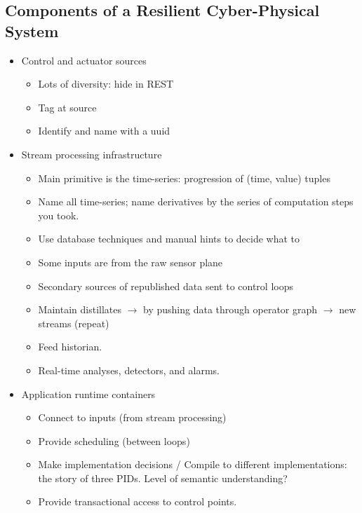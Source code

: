 \documentclass[10pt,twocolumn,letterpaper]{article}
\begin{document}
\subsection{Components of a Resilient Cyber-Physical System}


\begin{itemize}
\item Control and actuator sources
 \begin{itemize}
  \item{Lots of diversity: hide in REST}
  \item{Tag at source}
  \item{Identify and name with a uuid}
 \end{itemize}
\item Stream processing infrastructure
  \begin{itemize}
    \item Main primitive is the time-series: progression of (time, value) tuples
    \item Name all time-series; name derivatives by the series of computation steps you took.
    \item Use database techniques and manual hints to decide what to 
    \item Some inputs are from the raw sensor plane
    \item Secondary sources of republished data  sent to control loops
    \item Maintain distillates $\rightarrow$ by pushing data through operator graph $\rightarrow$ new streams (repeat)
    \item Feed historian.
    \item Real-time analyses, detectors, and alarms.
\end{itemize} 
\item Application runtime containers
  \begin{itemize}
    \item Connect to inputs (from stream processing)
    \item Provide scheduling (between loops)
    \item Make implementation decisions /  Compile to different implementations: the story of three PIDs.  Level of semantic understanding?
    \item Provide transactional access to control points.
  \end{itemize}


\end{itemize}
\end{document}
